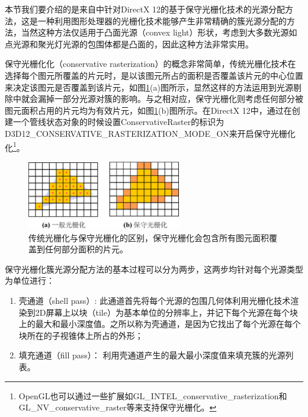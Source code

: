 本节我们要介绍的是来自\cite{a:GPUPro7:AdvancedRenderingTechniques}中针对DirectX 12的基于保守光栅化技术的光源分配方法，这是一种利用图形处理器的光栅化技术能够产生非常精确的簇光源分配的方法，当然这种方法仅适用于凸面光源（convex light）形状，考虑到大多数光源如点光源和聚光灯光源的包围体都是凸面的，因此这种方法非常实用。

保守光栅化化（conservative rasterization）的概念非常简单，传统光栅化技术在选择每个图元所覆盖的片元时，是以该图元所占的面积是否覆盖该片元的中心位置来决定该图元是否覆盖到该片元，如图\ref{f:shade-conservative-rasterization}(a)图所示，显然这样的方法运用到光源剔除中就会漏掉一部分光源对簇的影响。与之相对应，保守光栅化则考虑任何部分被图元面积占用的片元均为有效片元，如图\ref{f:shade-conservative-rasterization}(b)图所示。在DirectX 12中，通过在创建一个管线状态对象的时候设置ConservativeRaster的标识为D3D12\_CONSERVATIVE\_RASTERIZATION\_MODE\_ON来开启保守光栅化化\footnote{OpenGL也可以通过一些扩展如GL\_INTEL\_conservative\_rasterization和GL\_NV\_conservative\_raster等来支持保守光栅化。}。

\begin{figure}
	\sidecaption
	\includegraphics[width=0.6\textwidth]{figures/shade/conservative-rasterization}
	\caption{传统光栅化与保守光栅化的区别，保守光栅化会包含所有图元面积覆盖到任何部分面积的片元。}
	\label{f:shade-conservative-rasterization}
\end{figure}

保守光栅化簇光源分配方法的基本过程可以分为两步，这两步均针对每个光源类型为单位进行：

\begin{enumerate}
	\item 壳通道（shell pass）: 此通道首先将每个光源的包围几何体利用光栅化技术渲染到2D屏幕上以块（tile）为基本单位的分辨率上，并记下每个光源在每个块上的最大和最小深度值。之所以称为壳通道，是因为它找出了每个光源在每个块所在的子视锥体上所占的外形；
	\item 填充通道（fill pass）： 利用壳通道产生的最大最小深度值来填充簇的光源列表。
\end{enumerate}

